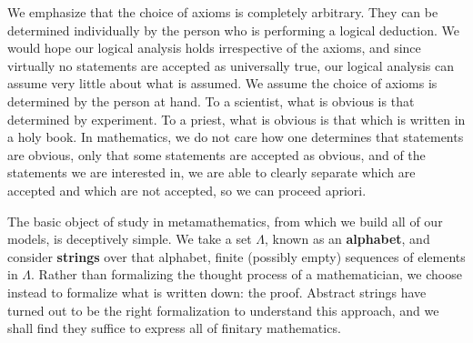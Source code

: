 We emphasize that the choice of axioms is completely arbitrary. They can be determined individually by the person who is performing a logical deduction. We would hope our logical analysis holds irrespective of the axioms, and since virtually no statements are accepted as universally true, our logical analysis can assume very little about what is assumed. We assume the choice of axioms is determined by the person at hand. To a scientist, what is obvious is that determined by experiment. To a priest, what is obvious is that which is written in a holy book. In mathematics, we do not care how one determines that statements are obvious, only that some statements are accepted as obvious, and of the statements we are interested in, we are able to clearly separate which are accepted and which are not accepted, so we can proceed apriori.

The basic object of study in metamathematics, from which we build all of our models, is deceptively simple. We take a set $\Lambda$, known as an {\bf alphabet}, and consider {\bf strings} over that alphabet, finite (possibly empty) sequences of elements in $\Lambda$. Rather than formalizing the thought process of a mathematician, we choose instead to formalize what is written down: the proof. Abstract strings have turned out to be the right formalization to understand this approach, and we shall find they suffice to express all of finitary mathematics.

